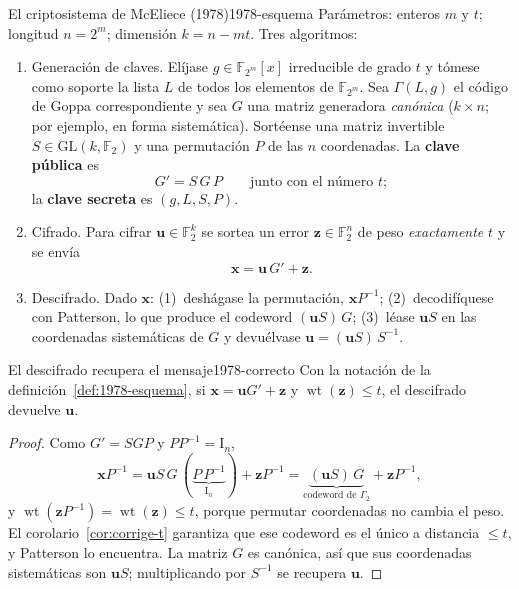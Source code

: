 \documentclass[11pt,a4paper,oneside]{report}
\newcommand{\F}{\mathbb{F}}
\newcommand{\wt}{\operatorname{wt}}
\newcommand{\vx}{\mathbf{x}}
\newcommand{\vu}{\mathbf{u}}
\newcommand{\vz}{\mathbf{z}}
\newcommand{\Ftwo}{\F_2}
\newcommand{\FF}[1]{\F_{2^{#1}}}
\begin{document}
\begin{definicion}{El criptosistema de McEliece (1978)}{1978-esquema}
Parámetros: enteros $m$ y $t$; longitud $n=2^m$; dimensión $k=n-mt$.
Tres algoritmos:
\begin{enumerate}[label=\textsc{\Alph*.},leftmargin=1.9em,itemsep=3pt]
  \item \textsf{Generación de claves.} Elíjase $g\in\FF{m}[x]$
        irreducible de grado $t$ y tómese como soporte la lista $L$ de
        todos los elementos de $\FF{m}$. Sea $\Gamma(L,g)$ el código de
        Goppa correspondiente y sea $G$ una matriz generadora
        \emph{canónica} ($k\times n$; por ejemplo, en forma
        sistemática). Sortéense una matriz invertible $S\in
        \mathrm{GL}(k,\Ftwo)$ y una permutación $P$ de las $n$
        coordenadas. La \textbf{clave pública} es
        \begin{equation}
          G' = S\,G\,P \qquad\text{junto con el número }t ;
          \label{eq:1978-gp}
        \end{equation}
        la \textbf{clave secreta} es $(g,L,S,P)$.
  \item \textsf{Cifrado.} Para cifrar $\vu\in\Ftwo^k$ se sortea un
        error $\vz\in\Ftwo^n$ de peso \emph{exactamente} $t$ y se envía
        \begin{equation}
          \vx = \vu\,G' + \vz .
          \label{eq:1978-enc}
        \end{equation}
  \item \textsf{Descifrado.} Dado $\vx$: (1)~deshágase la permutación,
        $\vx P^{-1}$; (2)~decodifíquese con Patterson, lo que produce
        el codeword $(\vu S)\,G$; (3)~léase $\vu S$ en las coordenadas
        sistemáticas de $G$ y devuélvase $\vu=(\vu S)\,S^{-1}$.
\end{enumerate}
\end{definicion}

\begin{proposicion}{El descifrado recupera el mensaje}{1978-correcto}
Con la notación de la definición~\ref{def:1978-esquema}, si
$\vx=\vu G'+\vz$ y $\wt(\vz)\le t$, el descifrado devuelve $\vu$.
\end{proposicion}

\begin{proof}
Como $G'=SGP$ y $PP^{-1}=\mathrm{I}_n$,
\begin{equation}
  \vx P^{-1}
  = \vu S\,G\,(\underbrace{P\,P^{-1}}_{\mathrm{I}_n}) + \vz P^{-1}
  = \underbrace{(\vu S)\,G}_{\text{codeword de }\Gamma_2} + \vz P^{-1},
  \label{eq:1978-xpinv}
\end{equation}
y $\wt(\vz P^{-1})=\wt(\vz)\le t$, porque permutar coordenadas no
cambia el peso. El corolario~\ref{cor:corrige-t} garantiza que ese
codeword es el único a distancia $\le t$, y Patterson lo encuentra. La
matriz $G$ es canónica, así que sus coordenadas sistemáticas son
$\vu S$; multiplicando por $S^{-1}$ se recupera $\vu$.
\end{proof}
\end{document}
